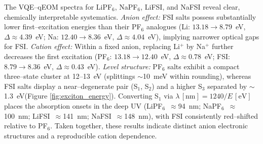 \documentclass[num-refs]{wiley-article}
\begin{document}

The VQE–qEOM spectra for LiPF$_6$, NaPF$_6$, LiFSI, and NaFSI reveal clear, chemically interpretable systematics. 
\emph{Anion effect:} FSI salts possess substantially lower first–excitation energies than their PF$_6$ analogues (Li: $13.18 \to 8.79$~eV, $\Delta\!\approx\!4.39$~eV; Na: $12.40 \to 8.36$~eV, $\Delta\!\approx\!4.04$~eV), implying narrower optical gaps for FSI. 
\emph{Cation effect:} Within a fixed anion, replacing Li$^+$ by Na$^+$ further decreases the first excitation (PF$_6$: $13.18 \to 12.40$~eV, $\Delta\!\approx\!0.78$~eV; FSI: $8.79 \to 8.36$~eV, $\Delta\!\approx\!0.43$~eV). 
\emph{Level structure:} PF$_6$ salts exhibit a compact three–state cluster at 12–13~eV (splittings $\sim$10~meV within rounding), whereas FSI salts display a near–degenerate pair (S$_1$, S$_2$) and a higher S$_3$ separated by $\sim$1.3~eV(Figure \ref{fig:exciton_energy}). 
Converting S$_1$ via $\lambda\,[\mathrm{nm}]=1240/E\,[\mathrm{eV}]$ places the absorption onsets in the deep UV (LiPF$_6$~$\approx$94~nm; NaPF$_6$~$\approx$100~nm; LiFSI~$\approx$141~nm; NaFSI~$\approx$148~nm), with FSI consistently red–shifted relative to PF$_6$. 
Taken together, these results indicate distinct anion electronic structures and a reproducible cation dependence.
\end{document}
